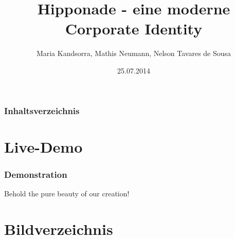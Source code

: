 \documentclass{beamer}
\begin{document}
\title{Hipponade - eine moderne Corporate Identity}  
\author{Maria Kandsorra, Mathis Neumann, Nelson Tavares de Sousa}
\date{25.07.2014} 

\begin{frame}
	\titlepage
\end{frame} 

\begin{frame}
	\frametitle{Inhaltsverzeichnis}
	\tableofcontents
\end{frame} 









\section{Live-Demo} 
\begin{frame}
	\frametitle{Demonstration} 
	Behold the pure beauty of our creation!
\end{frame}

\section{Bildverzeichnis}
\begin{frame}
	\listoffigures
\end{frame}
\end{document}
